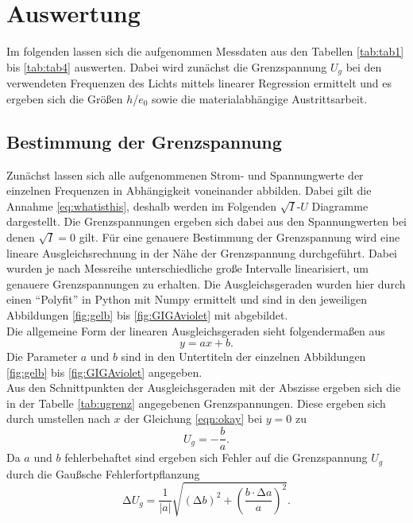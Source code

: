 \section{Auswertung}

Im folgenden lassen sich die aufgenommen Messdaten aus den Tabellen \ref{tab:tab1} bis \ref{tab:tab4} auswerten. Dabei wird zunächst die Grenzspannung $U_{g}$ bei den verwendeten Frequenzen des Lichts mittels linearer Regression ermittelt und es ergeben sich
die Größen $h$/$e_{0}$ sowie die materialabhängige Austrittsarbeit.

\subsection{Bestimmung der Grenzspannung}

Zunächst lassen sich alle aufgenommenen Strom- und Spannungwerte der einzelnen Frequenzen in Abhängigkeit voneinander abbilden. Dabei gilt die Annahme \eqref{eq:whatisthis}, deshalb werden im Folgenden $\sqrt{I}$-$U$ Diagramme dargestellt.
Die Grenzspannungen ergeben sich dabei aus den Spannungwerten bei denen $\sqrt{I} = 0$ gilt.
Für eine genauere Bestimmung der Grenzspannung wird eine lineare Ausgleichsrechnung in der Nähe der Grenzspannung durchgeführt.  Dabei wurden je nach Messreihe unterschiedliche große
Intervalle linearisiert, um genauere Grenzspannungen zu erhalten. 
Die Ausgleichsgeraden wurden hier durch einen \enquote{Polyfit} in Python mit Numpy \cite{numpy} ermittelt und sind in den jeweiligen Abbildungen \ref{fig:gelb} bis \ref{fig:GIGAviolet} mit abgebildet.
\\
Die allgemeine Form der linearen Ausgleichsgeraden sieht folgendermaßen aus
\begin{equation}
    \label{eqn:okay}
y = ax + b.
\end{equation}
Die Parameter $a$ und $b$ sind in den Untertiteln der einzelnen Abbildungen \ref{fig:gelb} bis \ref{fig:GIGAviolet} angegeben.
\\
Aus den Schnittpunkten der Ausgleichsgeraden mit der Abszisse ergeben sich die in der Tabelle \ref{tab:ugrenz} angegebenen Grenzspannungen.
Diese ergeben sich durch umstellen nach $x$ der Gleichung \eqref{eqn:okay} bei $y = 0$ zu 
\begin{equation*}
U_g = -\frac{b}{a}.
\end{equation*}
Da $a$ und $b$ fehlerbehaftet sind ergeben sich Fehler auf die Grenzspannung $U_g$ durch die Gaußsche Fehlerfortpflanzung
\begin{equation*}
\increment U_g = \frac{1}{|a|} \sqrt{(\increment b)^2 + \left( \frac{b \cdot \increment a}{a}\right)^2}.
\end{equation*}
